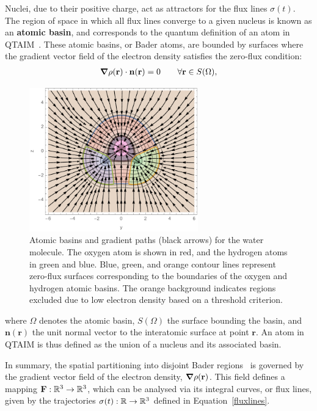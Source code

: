 \newpage
Nuclei, due to their positive charge, act as attractors for the flux lines
$\sigma(t)$. The region of space in which all flux lines converge to a given
nucleus is known as an \textbf{atomic basin}, and corresponds to the quantum
definition of an atom in QTAIM~\cite{bader}. These atomic basins, or Bader
atoms, are bounded by surfaces where the gradient vector field of the electron
density satisfies the zero-flux condition:
%
\begin{gather}
  \boldsymbol{\nabla}\rho(\mathbf{r})\cdot\mathbf{n(r)} = 0 \qquad \forall\mathbf{r}\in S(\Omega),
  \label{cero_f}
\end{gather}
%
\begin{figure}
  \centering
  \vspace{-0.4cm}%
  \includegraphics[width=0.65\textwidth]{./img/awa_basin}
  \caption{Atomic basins and gradient paths (black arrows) for the water
    molecule. The oxygen atom is shown in red, and the hydrogen atoms in green
    and blue. Blue, green, and orange contour lines represent zero-flux surfaces
    corresponding to the boundaries of the oxygen and hydrogen atomic basins.
    The orange background indicates regions excluded due to low electron density
    based on a threshold criterion.}
  \label{awaflux}
\end{figure}
%
\noindent where $\Omega$ denotes the atomic basin, $S(\Omega)$ the surface
bounding the basin, and $\mathbf{n}(\mathbf{r})$ the unit normal vector to the
interatomic surface at point $\mathbf{r}$. An atom in QTAIM is thus defined as
the union of a nucleus and its associated basin.

\vspace{1.4\baselineskip}%
In summary, the spatial partitioning into disjoint Bader regions~\cite{bader} is
governed by the gradient vector field of the electron density, $\boldsymbol{\nabla}\rho(\mathbf{r})$.
This field defines a mapping $\mathbf{F} : \rreal[3] \to \rreal[3]$, which can
be analysed via its integral curves, or flux lines, given by the trajectories
$\sigma(t) : \rreal \to \rreal[3]$ defined in Equation~\ref{fluxlines}.

